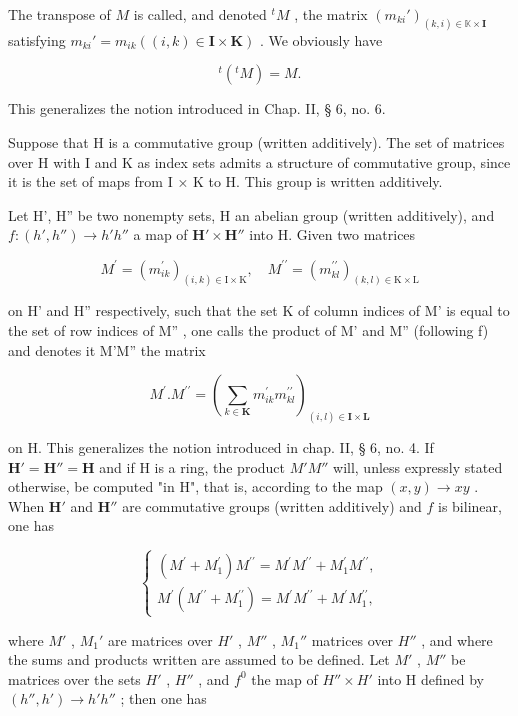 The transpose of \(M\) is called, and denoted \({}^t M\) , the matrix \((m_{ki}')_{(k,i) \in \mathbb{K} \times \mathbf{I}}\) satisfying \(m_{ki}' = m_{ik} ((i, k) \in \mathbf{I} \times \mathbf{K})\) . We obviously have

\[
^ {t} (^ {t} M) = M.\tag{39}
\]

This generalizes the notion introduced in Chap. II, § 6, no. 6.

Suppose that H is a commutative group (written additively). The set of matrices over H with I and K as index sets admits a structure of commutative group, since it is the set of maps from I × K to H. This group is written additively.

Let H', H'' be two nonempty sets, H an abelian group (written additively), and \(f:(h',h'')\to h'h''\) a map of \(\mathbf{H}'\times\mathbf{H}''\) into H. Given two matrices

\[
M ^ {\prime} = (m _ {i k} ^ {\prime}) _ {(i, k) \in \mathrm{I} \times \mathrm{K}}, \quad M ^ {\prime \prime} = (m _ {k l} ^ {\prime \prime}) _ {(k, l) \in \mathrm{K} \times \mathrm{L}}
\]

on H' and H'' respectively, such that the set K of column indices of M' is equal to the set of row indices of M'' , one calls the product of M' and M'' (following f) and denotes it M'M'' the matrix

\[
M ^ {\prime}. M ^ {\prime \prime} = (\sum_ {k \in \mathbf {K}} m _ {i k} ^ {\prime} m _ {k l} ^ {\prime \prime}) _ {(i, l) \in \mathbf {I} \times \mathbf {L}}\tag{40}
\]

on H. This generalizes the notion introduced in chap. II, § 6, no. 4. If \(\mathbf{H}' = \mathbf{H}'' = \mathbf{H}\) and if H is a ring, the product \(M'M''\) will, unless expressly stated otherwise, be computed "in H", that is, according to the map \((x, y) \to xy\) . When \(\mathbf{H}'\) and \(\mathbf{H}''\) are commutative groups (written additively) and \(f\) is bilinear, one has

\[
\left\{ \begin{array}{l} (M ^ {\prime} + M _ {1} ^ {\prime}) M ^ {\prime \prime} = M ^ {\prime} M ^ {\prime \prime} + M _ {1} ^ {\prime} M ^ {\prime \prime}, \\ M ^ {\prime} (M ^ {\prime \prime} + M _ {1} ^ {\prime \prime}) = M ^ {\prime} M ^ {\prime \prime} + M ^ {\prime} M _ {1} ^ {\prime \prime}, \end{array} \right.\tag{41}
\]

where \(M'\) , \(M_1'\) are matrices over \(H'\) , \(M''\) , \(M_1''\) matrices over \(H''\) , and where the sums and products written are assumed to be defined. Let \(M'\) , \(M''\) be matrices over the sets \(H'\) , \(H''\) , and \(f^0\) the map of \(H'' \times H'\) into H defined by \((h'', h') \to h' h''\) ; then one has

